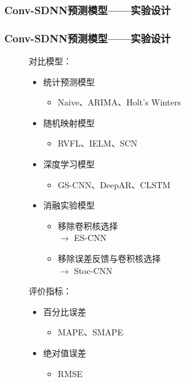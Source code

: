 \begin{frame}
    \frametitle{Conv-SDNN预测模型——实验设计}

    

\end{frame}

\begin{frame}
    \frametitle{Conv-SDNN预测模型——实验设计}

    \begin{figure}
        \begin{minipage}[t]{0.5\textwidth}
            对比模型：
            \begin{itemize}
                \item 统计预测模型
                      \begin{itemize}
                          \item Naive、ARIMA、Holt’s Winters
                      \end{itemize}
                \item 随机映射模型
                      \begin{itemize}
                          \item RVFL、IELM、SCN
                      \end{itemize}
                \item 深度学习模型
                      \begin{itemize}
                          \item GS-CNN、DeepAR、CLSTM
                      \end{itemize}
                \item 消融实验模型
                      \begin{itemize}
                          \item 移除卷积核选择 \\ \(\rightarrow\) ES-CNN
                          \item 移除误差反馈与卷积核选择 \\ \(\rightarrow\) Stoc-CNN
                      \end{itemize}
            \end{itemize}
        \end{minipage}
        \hfill
        \begin{minipage}[t]{0.45\textwidth}
            评价指标：
            \begin{itemize}
                \item 百分比误差
                      \begin{itemize}
                          \item MAPE、SMAPE
                      \end{itemize}
                \item 绝对值误差
                      \begin{itemize}
                          \item RMSE
                      \end{itemize}
            \end{itemize}


\end{minipage}
\end{figure}
\end{frame}
